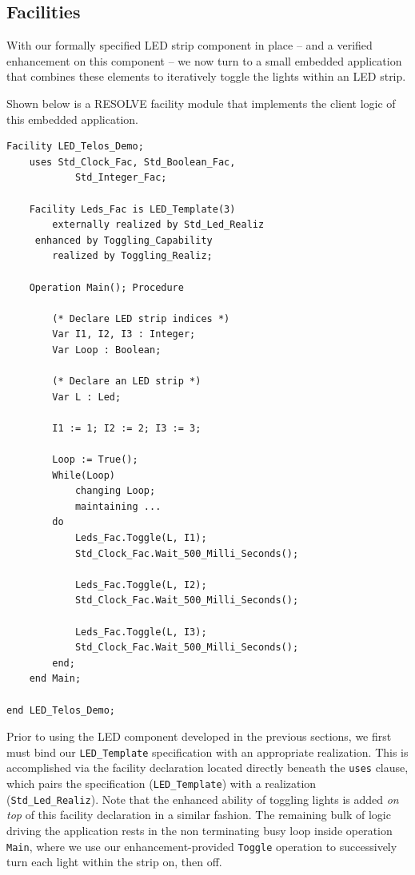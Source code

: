 \documentclass{sig-alternate}
\begin{document}
\subsection{Facilities}
\label{sec:facilities}

With our formally specified LED strip component in place -- and a verified enhancement on this component -- we now turn to a small embedded application that combines these elements to iteratively toggle the lights within an LED strip.

Shown below is a RESOLVE facility module that implements the client logic of this embedded application.
\begin{verbatim}
Facility LED_Telos_Demo;
    uses Std_Clock_Fac, Std_Boolean_Fac, 
            Std_Integer_Fac;
    
    Facility Leds_Fac is LED_Template(3)
        externally realized by Std_Led_Realiz
     enhanced by Toggling_Capability
        realized by Toggling_Realiz;
        
    Operation Main(); Procedure
    
        (* Declare LED strip indices *)
        Var I1, I2, I3 : Integer;
        Var Loop : Boolean;
        
        (* Declare an LED strip *)
        Var L : Led;
        
        I1 := 1; I2 := 2; I3 := 3;
        
        Loop := True();
        While(Loop)
            changing Loop;
            maintaining ...
        do
            Leds_Fac.Toggle(L, I1);
            Std_Clock_Fac.Wait_500_Milli_Seconds();
            
            Leds_Fac.Toggle(L, I2);
            Std_Clock_Fac.Wait_500_Milli_Seconds();
            
            Leds_Fac.Toggle(L, I3);
            Std_Clock_Fac.Wait_500_Milli_Seconds();
        end;
    end Main;
    
end LED_Telos_Demo;
\end{verbatim}
Prior to using the LED component developed in the previous sections, we first must bind our \texttt{LED\_Template} specification with an appropriate realization. This is accomplished via the facility declaration located directly beneath the \texttt{uses} clause, which pairs the specification (\texttt{LED\_Template}) with a realization (\texttt{Std\_Led\_Realiz}). Note that the enhanced ability of toggling lights is added \textit{on top} of this facility declaration in a similar fashion. The remaining bulk of logic driving the application rests in the non terminating busy loop inside operation \texttt{Main}, where we use our enhancement-provided \texttt{Toggle} operation to successively turn each light within the strip on, then off.
\end{document}
